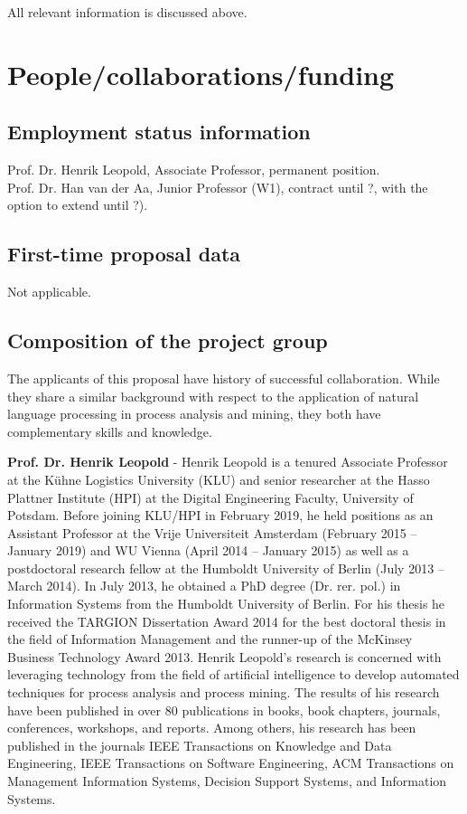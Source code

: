 \documentclass{scrartcl}
\begin{document}
All relevant information is discussed above. 

\section{People/collaborations/funding}

\subsection{Employment status information}

Prof. Dr. Henrik Leopold, Associate Professor, permanent position.\\
Prof. Dr. Han van der Aa, Junior Professor (W1), contract until ?, with the option to extend until ?).


\subsection{First-time proposal data}

Not applicable.

\subsection{Composition of the project group}

The applicants of this proposal have history of successful collaboration. While they share a similar background with respect to the application of natural language processing in process analysis and mining, they both have complementary skills and knowledge. 

\textbf{Prof. Dr. Henrik Leopold} - Henrik Leopold is a tenured Associate Professor at the K\"uhne Logistics University (KLU) and senior researcher at the Hasso Plattner Institute (HPI) at the Digital Engineering Faculty, University of Potsdam. Before joining KLU/HPI in February 2019, he held positions as an Assistant Professor at the Vrije Universiteit Amsterdam (February 2015 – January 2019) and WU Vienna (April 2014 – January 2015) as well as a postdoctoral research fellow at the Humboldt University of Berlin (July 2013 – March 2014). In July 2013, he obtained a PhD degree (Dr. rer. pol.) in Information Systems from the Humboldt University of Berlin. For his thesis he received the TARGION Dissertation Award 2014 for the best doctoral thesis in the field of Information Management and the runner-up of the McKinsey Business Technology Award 2013. Henrik Leopold's research is concerned with leveraging technology from the field of artificial intelligence to develop automated techniques for process analysis and process mining. The results of his research have been published in over 80 publications in books, book chapters, journals, conferences, workshops, and reports. Among others, his research has been published in the journals IEEE Transactions on Knowledge and Data Engineering, IEEE Transactions on Software Engineering, ACM Transactions on Management Information Systems, Decision Support Systems, and Information Systems. 
\end{document}
